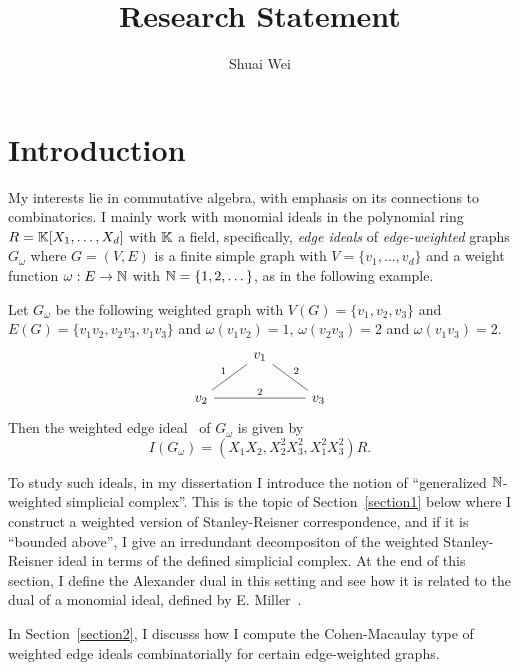 \documentclass{article}
\begin{document}
\title{Research Statement} 
\author{Shuai Wei} 
\date{}
\maketitle

\section{Introduction}

My interests lie in commutative algebra, with emphasis on its connections to combinatorics. I mainly work with monomial ideals in the polynomial ring $R = \mathbb{K}[X_1,\dots,X_d]$ with $\mathbb{K}$ a field, specifically, \emph{edge ideals} of \emph{edge-weighted} graphs $G_\omega$ where $G = (V,E)$ is a finite simple graph with $V = \{v_1,\dots,v_d\}$ and a weight function $\omega: E \to \mathbb{N}$ with $\mathbb{N} = \{1,2,\dots\}$, as in the following example.

\begin{example} \label{uOmeMJuOmeMExample}
    Let $G_\omega$ be the following weighted graph with $V(G) = \{v_1,v_2,v_3\}$ and $E(G) = \{v_1v_2,v_2v_3,v_1v_3\}$ and $\omega(v_1v_2) = 1$, $\omega(v_2v_3) = 2$ and $\omega(v_1v_3) = 2$.
    \[
        \begin{tikzcd}
            & v_1 \ar[ld,dash,"1"'] \ar[rd,dash,"2"] \\
            v_2 \ar[rr,dash,"2"] && v_3
        \end{tikzcd}
    \]
    Then the weighted edge ideal~\cite{MR3055580} of $G_\omega$ is given by 
    \[I(G_\omega) = (X_1X_2,X_2^2X_3^2,X_1^2X_3^2)R.\]
\end{example}

    To study such ideals, in my dissertation I introduce the notion of ``generalized $\mathbb{N}$-weighted simplicial complex''. This is the topic of Section~\ref{section1} below where I construct a weighted version of Stanley-Reisner correspondence, and if it is ``bounded above'', I give an irredundant decompositon of the weighted Stanley-Reisner ideal in terms of the defined simplicial complex. At the end of this section, I define the Alexander dual in this setting and see how it is related to the dual of a monomial ideal, defined by E. Miller~\cite{miller1998alexander}.

    In Section~\ref{section2}, I discusss how I compute the Cohen-Macaulay type of weighted edge ideals combinatorially for certain edge-weighted graphs. \par
\end{document}
